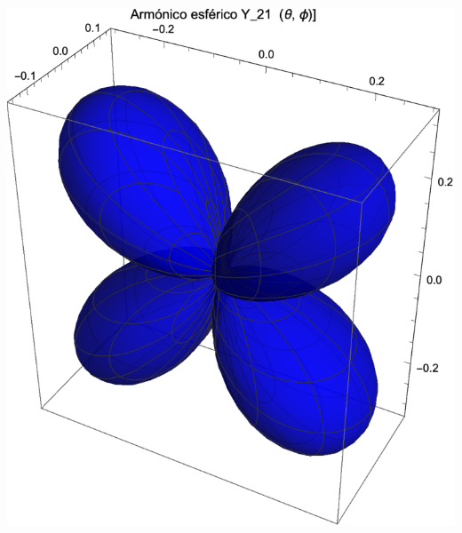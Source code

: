 \begin{minipage}{0.4\textwidth}
    \centering
    \includegraphics[scale=0.65]{Imagenes/Armonicos_Esfericos_21.eps}
\end{minipage}
